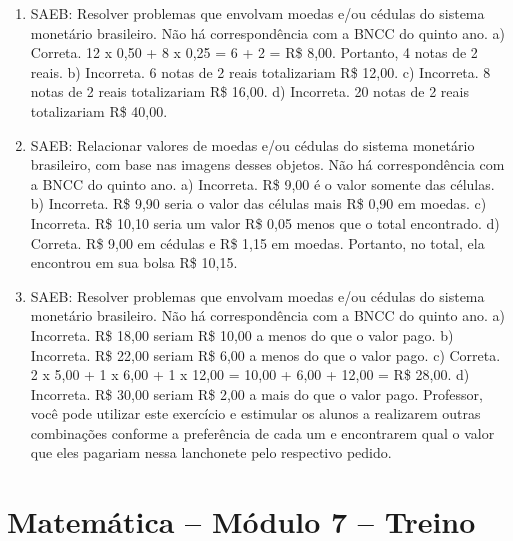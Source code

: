 \begin{enumerate}
\item
SAEB: Resolver problemas que envolvam moedas e/ou cédulas do sistema monetário brasileiro.
Não há correspondência com a BNCC do quinto ano.
a) Correta.
12 x 0,50 + 8 x 0,25 = 6 + 2 = R\$ 8,00. Portanto, 4 notas de 2 reais.
b) Incorreta. 6 notas de 2 reais totalizariam R\$ 12,00.
c) Incorreta. 8 notas de 2 reais totalizariam R\$ 16,00.
d) Incorreta. 20 notas de 2 reais totalizariam R\$ 40,00.

\item
SAEB: Relacionar valores de moedas e/ou cédulas do sistema monetário brasileiro, com base nas imagens desses objetos.
Não há correspondência com a BNCC do quinto ano.
a) Incorreta. R\$ 9,00 é o valor somente das células.
b) Incorreta. R\$ 9,90 seria o valor das células mais R\$ 0,90 em moedas.
c) Incorreta. R\$ 10,10 seria um valor R\$ 0,05 menos que o total encontrado.
d) Correta. 
R\$ 9,00 em cédulas e R\$ 1,15 em moedas. Portanto, no total, ela
encontrou em sua bolsa R\$ 10,15.

\item
SAEB: Resolver problemas que envolvam moedas e/ou cédulas do sistema monetário brasileiro.
Não há correspondência com a BNCC do quinto ano.
a) Incorreta. R\$ 18,00 seriam R\$ 10,00 a menos do que o valor pago.
b) Incorreta. R\$ 22,00 seriam R\$ 6,00 a menos do que o valor pago.
c) Correta. 2 x 5,00 + 1 x 6,00 + 1 x 12,00 = 10,00 + 6,00 + 12,00 = R\$ 28,00.
d) Incorreta. R\$ 30,00 seriam R\$ 2,00 a mais do que o valor pago.
Professor, você pode utilizar este exercício e estimular os alunos a
realizarem outras combinações conforme a preferência de cada um e
encontrarem qual o valor que eles pagariam nessa lanchonete pelo respectivo pedido.
\end{enumerate}

\section*{Matemática -- Módulo 7 -- Treino}

